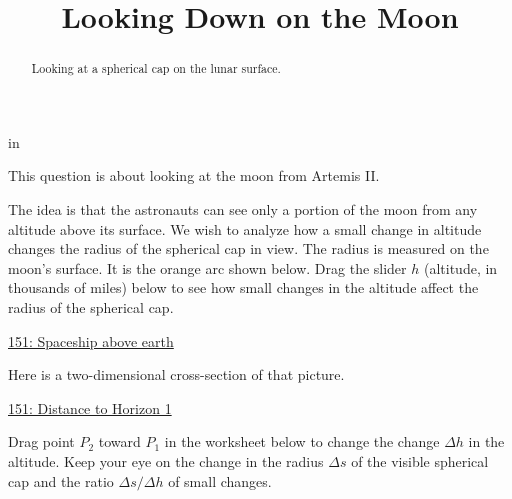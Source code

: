 \documentclass{ximera}
\title{Looking Down on the Moon}
\newcommand{\pskip}{\vskip 0.1 in}
\begin{document}
\begin{abstract}
Looking at a spherical cap on the lunar surface.
\end{abstract}
\maketitle


\pskip



\begin{question}  \label{QKdf3Dfdrler33}

This question is about looking at the moon from Artemis II.

The idea is that the astronauts can see only a portion of the moon from any altitude above its surface. We wish to analyze how a small change in altitude changes the radius of the spherical cap in view. The radius is measured on the moon's surface. It is the orange arc shown below. Drag the slider $h$ (altitude, in thousands of miles) below to see how small changes in the altitude affect the radius of the spherical cap.

\begin{onlineOnly}
    \begin{center}
\end{center}
\end{onlineOnly}

\href{https://www.desmos.com/3d/paqpozwuxm}{151: Spaceship above earth}

Here is a two-dimensional cross-section of that picture.

\begin{onlineOnly}
    \begin{center}
\end{center}
\end{onlineOnly}

\href{https://www.desmos.com/calculator/b5c4c7ba17}{151: Distance to Horizon 1}

Drag point $P_2$ toward $P_1$ in the worksheet below to change the change $\Delta h$ in the altitude. Keep your eye on the change in the radius $\Delta s$ of the visible spherical cap and the ratio $\Delta s/\Delta h$ of small changes.

\begin{onlineOnly}
    \begin{center}
\end{center}
\end{onlineOnly}


\end{question}
\end{document}
